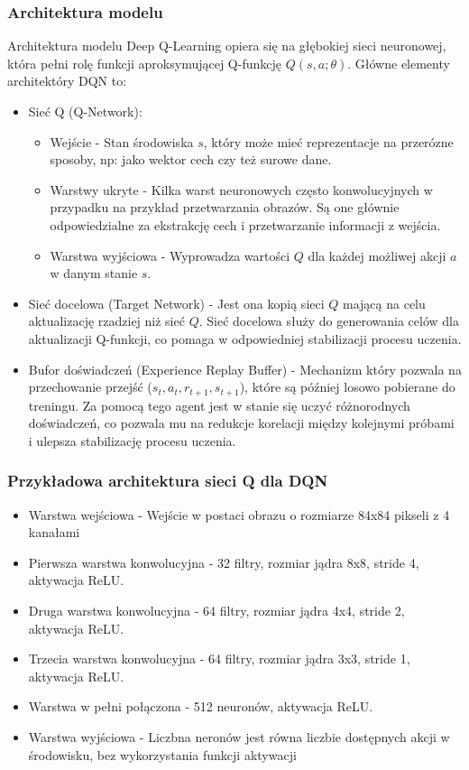 \documentclass[a4paper, 10pt]{article}
\begin{document}
    \subsubsection{Architektura modelu}
    Architektura modelu Deep Q-Learning opiera się na głębokiej sieci neuronowej, która pełni rolę funkcji aproksymującej 
    Q-funkcję \( Q(s,a;\theta) \). Główne elementy architektóry DQN to:
    \begin{itemize}
        \item Sieć Q (Q-Network):
        \begin{itemize}
            \item Wejście - Stan środowiska \( s \), który może mieć reprezentacje na przerózne sposoby, np: jako wektor cech 
            czy też surowe dane.
            \item Warstwy ukryte - Kilka warst neuronowych często konwolucyjnych w przypadku na przykład przetwarzania obrazów.
            Są one głównie odpowiedzialne za ekstrakcję cech i przetwarzanie informacji z wejścia.
            \item Warstwa wyjściowa - Wyprowadza wartości \( Q \) dla każdej możliwej akcji \( a \) w danym stanie \( s \).
        \end{itemize}
        \item Sieć docelowa (Target Network) - Jest ona kopią sieci \( Q \) mającą na celu aktualizację rzadziej niż sieć \( Q \).
        Sieć docelowa służy do generowania celów dla aktualizacji Q-funkcji, co pomaga w odpowiedniej stabilizacji procesu uczenia.
        \item Bufor doświadczeń (Experience Replay Buffer) - Mechanizm który pozwala na przechowanie przejść (\( s_t, a_t, r_{t+1}, s_{t+1} \)),
        które są później losowo pobierane do treningu. Za pomocą tego agent jest w stanie się uczyć różnorodnych doświadczeń,
        co pozwala mu na redukcje korelacji między kolejnymi próbami i ulepsza stabilizację procesu uczenia.
    \end{itemize}
    \subsubsection{Przykładowa architektura sieci Q dla DQN}
    \begin{itemize}
        \item Warstwa wejściowa - Wejście w postaci obrazu o rozmiarze 84x84 pikseli z 4 kanałami
        \item Pierwsza warstwa konwolucyjna - 32 filtry, rozmiar jądra 8x8, stride 4, aktywacja ReLU.
        \item Druga warstwa konwolucyjna - 64 filtry, rozmiar jądra 4x4, stride 2, aktywacja ReLU.
        \item Trzecia warstwa konwolucyjna - 64 filtry, rozmiar jądra 3x3, stride 1, aktywacja ReLU.
        \item Warstwa w pełni połączona - 512 neuronów, aktywacja ReLU.
        \item Warstwa wyjściowa - Liczbna neronów jest równa liczbie dostępnych akcji w środowisku, bez wykorzystania funkcji aktywacji
    \end{itemize}
\end{document}
